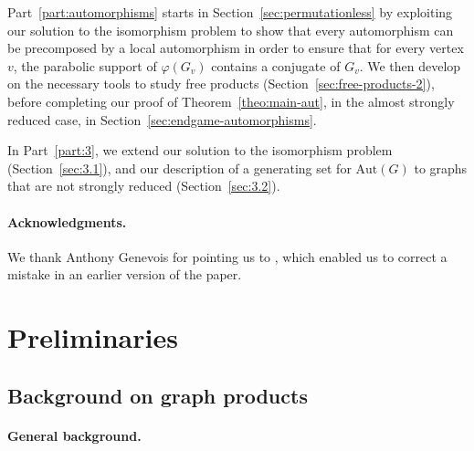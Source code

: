 \documentclass[a4paper,english,11pt]{article}
\theoremstyle{definition}
\theoremstyle{remark}
\newcommand{\Aut}{\mathrm{Aut}}
\begin{document}
Part~\ref{part:automorphisms} starts in Section~\ref{sec:permutationless} by exploiting our solution to the isomorphism problem to show that every automorphism can be precomposed by a local automorphism in order to ensure that for every vertex $v$, the parabolic support of $\varphi(G_v)$ contains a conjugate of $G_v$. We then develop on the necessary tools to study free products (Section~\ref{sec:free-products-2}), before completing our proof of Theorem~\ref{theo:main-aut}, in the almost strongly reduced case, in Section~\ref{sec:endgame-automorphisms}.

In Part~\ref{part:3}, we extend our solution to the isomorphism problem (Section~\ref{sec:3.1}), and our description of a generating set for $\Aut(G)$ to graphs that are not strongly reduced (Section~\ref{sec:3.2}).

\paragraph{Acknowledgments.} We thank Anthony Genevois for pointing us to
\cite{MO}, which enabled us to correct a mistake in an earlier version of the
paper.



%
\section{Preliminaries}\label{sec:prelims}
\subsection{Background on graph products}\label{sec:background-graph-product}

\paragraph*{General background.}
\end{document}
